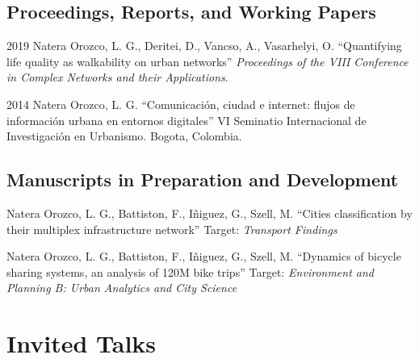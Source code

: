\documentclass{academiccv}
\begin{document}
\subsection*{Proceedings, Reports, and Working Papers}

\begin{tablist}

\item[2019] \tab Natera Orozco, L. G., Deritei, D., Vancso, A., Vasarhelyi, O. \enquote{Quantifying life quality as walkability on urban networks} \textit{Proceedings of the VIII Conference in Complex Networks and their Applications}.

\item[2014] \tab Natera Orozco, L. G. \enquote{Comunicación, ciudad e internet: flujos de información urbana en entornos digitales} VI Seminatio Internacional de Investigación en Urbanismo. Bogota, Colombia.

\end{tablist}



\subsection*{Manuscripts in Preparation and Development}

\begin{tablist}

\item[\the\year] Natera Orozco, L. G., Battiston, F., I\~niguez, G., Szell, M. \enquote{Cities classification by their multiplex infrastructure network} Target: \textit{Transport Findings}

\item[\the\year] Natera Orozco, L. G., Battiston, F., I\~niguez, G., Szell, M. \enquote{Dynamics of bicycle sharing systems, an analysis of 120M bike trips} Target: \textit{Environment and Planning B: Urban Analytics and City Science}

\end{tablist}


\section*{Invited Talks}
\end{document}
